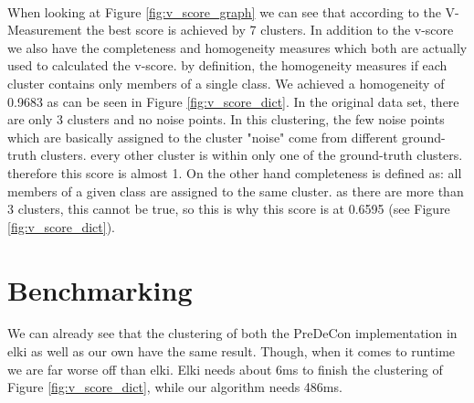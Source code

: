 \documentclass[a4paper]{article}
\begin{document}
\paragraph{}
When looking at Figure \ref{fig:v_score_graph} we can see that according to the V-Measurement the best score is achieved by 7 clusters. In addition to the v-score we also have the completeness and homogeneity measures which both are actually used to calculated the v-score. by definition, the homogeneity measures if each cluster contains only members of a single class. We achieved a homogeneity of 0.9683 as can be seen in Figure \ref{fig:v_score_dict}. In the original data set, there are only 3 clusters and no noise points. In this clustering, the few noise points which are basically assigned to the cluster "noise" come from different ground-truth clusters. every other cluster is within only one of the ground-truth clusters. therefore this score is almost 1. On the other hand completeness is defined as: all members of a given class are assigned to the same cluster. as there are more than 3 clusters, this cannot be true, so this is why this score is at 0.6595 (see Figure \ref{fig:v_score_dict}).

\section{Benchmarking}
We can already see that the clustering of both the PreDeCon implementation in elki as well as our own have the same result. Though, when it comes to runtime we are far worse off than elki. Elki needs about 6ms to finish the clustering of Figure \ref{fig:v_score_dict}, while our algorithm needs 486ms.



\end{document}
